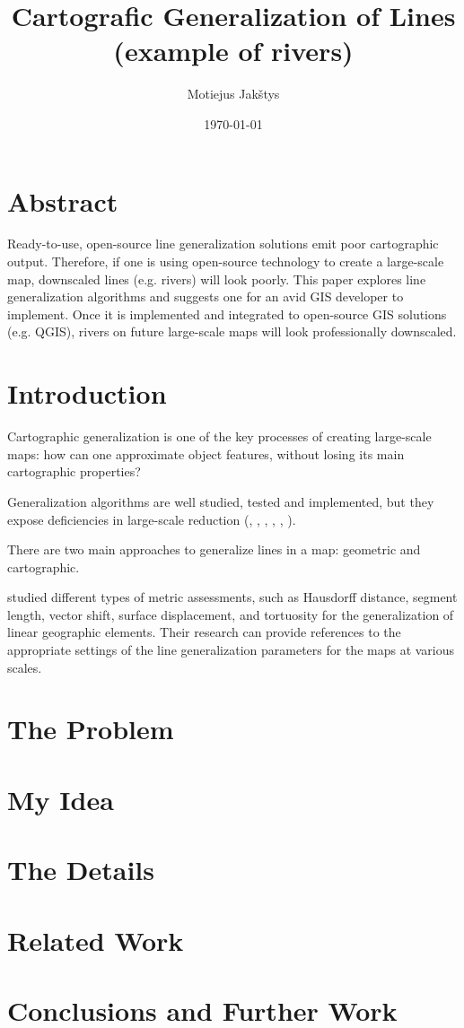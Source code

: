 \documentclass{article}
\title{
    Cartografic Generalization of Lines \\
    (example of rivers) \\ \vspace{4mm}
}
\author{Motiejus Jakštys}
\date{\today}
\begin{document}
\maketitle

\newpage

\section{Abstract}
\label{sec:abstract}

Ready-to-use, open-source line generalization solutions emit poor cartographic
output. Therefore, if one is using open-source technology to create a
large-scale map, downscaled lines (e.g. rivers) will look poorly. This paper
explores line generalization algorithms and suggests one for an avid GIS
developer to implement. Once it is implemented and integrated to open-source
GIS solutions (e.g. QGIS), rivers on future large-scale maps will look
professionally downscaled.

\section{Introduction}
\label{sec:introduction}

Cartographic generalization is one of the key processes of creating large-scale
maps: how can one approximate object features, without losing its main
cartographic properties?

Generalization algorithms are well studied, tested and implemented, but they
expose deficiencies in large-scale reduction (\cite{monmonier1986toward},
\cite{mcmaster1993spatial}, \cite{jiang2003line}, \cite{dyken2009simultaneous},
\cite{mustafa2006dynamic}, \cite{nollenburg2008morphing}).

There are two main approaches to generalize lines in a map: geometric and
cartographic.

\cite{stanislawski2012automated} studied different types of metric assessments,
such as Hausdorff distance, segment length, vector shift, surface displacement,
and tortuosity for the generalization of linear geographic elements. Their
research can provide references to the appropriate settings of the line
generalization parameters for the maps at various scales.

\section{The Problem}
\label{sec:the_problem}

\section{My Idea}
\label{sec:my_idea}

\section{The Details}
\label{sec:the_details}

\section{Related Work}
\label{sec:related_work}

\section{Conclusions and Further Work}
\label{sec:conclusions_and_further_work}

\printbibliography
\end{document}
